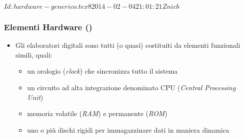 %
%
%
%
%
\svnInfo $Id: hardware-generico.tex 8 2014-02-04 21:01:21Z nicb $

\setcounter{ms}{1}
\begin{frame}
    \frametitle{Elementi Hardware ()}

	\begin{itemize}[<+- | alert@+->]

		\item Gli elaboratori digitali sono tutti (o quasi)
              costituiti da elementi funzionali simili, quali:

			  \begin{itemize}[<+- | alert@+->]

				\item un orologio (\emph{clock}) che sincronizza tutto
                      il sistema
				\item un circuito ad alta integrazione denominato CPU
				      (\emph{Central Processing Unit})
				\item memoria volatile (\emph{RAM})
				      e permanente (\emph{ROM})
				\item uno o pi\`u dischi rigidi per immagazzinare
				      dati in maniera dinamica

			\end{itemize}

	\end{itemize}

\end{frame}

